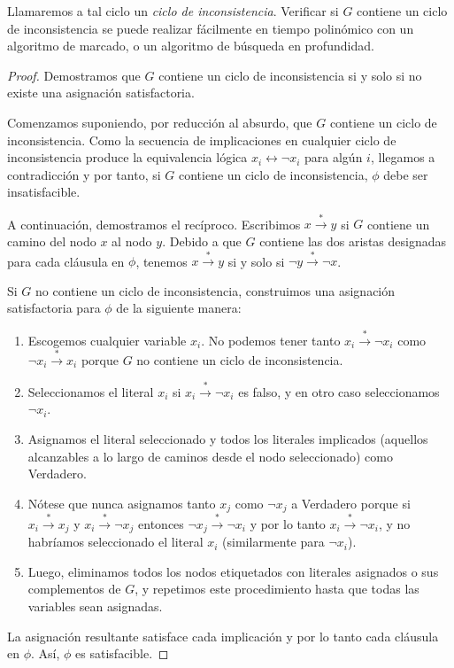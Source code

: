 \documentclass[a4paper,12pt]{article}
\begin{document}
Llamaremos a tal ciclo un \textit{ciclo de inconsistencia}. Verificar si $G$ contiene un ciclo de inconsistencia se puede realizar fácilmente en tiempo polinómico con un algoritmo de marcado, o un algoritmo de búsqueda en profundidad.

\begin{proof}

Demostramos que $G$ contiene un ciclo de inconsistencia si y solo si no existe una asignación satisfactoria. 

Comenzamos suponiendo, por reducción al absurdo, que $G$ contiene un ciclo de inconsistencia. Como la secuencia de implicaciones en cualquier ciclo de inconsistencia produce la equivalencia lógica $x_i \leftrightarrow \neg x_i$ para algún $i$, llegamos a contradicción y por tanto, si $G$ contiene un ciclo de inconsistencia, $\phi$ debe ser insatisfacible.

A continuación, demostramos el recíproco. Escribimos $x \stackrel{*}{\rightarrow} y$ si $G$ contiene un camino del nodo $x$ al nodo $y$. Debido a que $G$ contiene las dos aristas designadas para cada cláusula en $\phi$, tenemos $x \stackrel{*}{\rightarrow} y$ si y solo si $\neg y \stackrel{*}{\rightarrow} \neg x$.

Si $G$ no contiene un ciclo de inconsistencia, construimos una asignación satisfactoria para $\phi$ de la siguiente manera:

\begin{enumerate}
    \item Escogemos cualquier variable $x_i$. No podemos tener tanto $x_i \stackrel{*}{\rightarrow} \neg x_i$ como $\neg x_i \stackrel{*}{\rightarrow} x_i$ porque $G$ no contiene un ciclo de inconsistencia.
    
    \item Seleccionamos el literal $x_i$ si $x_i \stackrel{*}{\rightarrow} \neg x_i$ es falso, y en otro caso seleccionamos $\neg x_i$.
    
    \item Asignamos el literal seleccionado y todos los literales implicados (aquellos alcanzables a lo largo de caminos desde el nodo seleccionado) como Verdadero.
    
    \item Nótese que nunca asignamos tanto $x_j$ como $\neg x_j$ a Verdadero porque si $x_i \stackrel{*}{\rightarrow} x_j$ y $x_i \stackrel{*}{\rightarrow} \neg x_j$ entonces $\neg x_j \stackrel{*}{\rightarrow} \neg x_i$ y por lo tanto $x_i \stackrel{*}{\rightarrow} \neg x_i$, y no habríamos seleccionado el literal $x_i$ (similarmente para $\neg x_i$).
    
    \item Luego, eliminamos todos los nodos etiquetados con literales asignados o sus complementos de $G$, y repetimos este procedimiento hasta que todas las variables sean asignadas.
\end{enumerate}

La asignación resultante satisface cada implicación y por lo tanto cada cláusula en $\phi$. Así, $\phi$ es satisfacible.

\end{proof}
\end{document}
